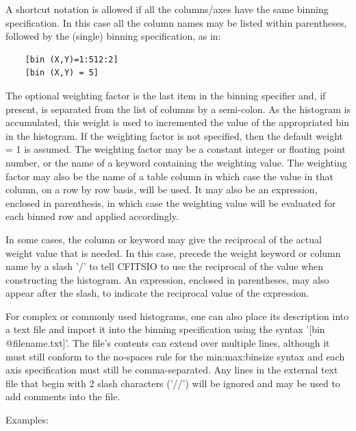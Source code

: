 \documentclass[11pt]{book}
\begin{document}
A shortcut notation is allowed if all the columns/axes have the same
binning specification.  In this case all the column names may be listed
within parentheses, followed by the (single) binning specification, as
in:

\begin{verbatim}
    [bin (X,Y)=1:512:2]
    [bin (X,Y) = 5]
\end{verbatim}

The optional weighting factor is the last item in the binning specifier
and, if present, is separated from the list of columns by a
semi-colon.  As the histogram is accumulated, this weight is used to
incremented the value of the appropriated bin in the histogram.  If the
weighting factor is not specified, then the default weight = 1 is
assumed.  The weighting factor may be a constant integer or floating
point number, or the name of a keyword containing the weighting value.
The weighting factor may also be the name of a table column in which case
the value in that column, on a row by row basis, will be used.
It may also be an expression, enclosed in parenthesis, in which case
the weighting value will be evaluated for each binned row and applied
accordingly.

In some cases, the column or keyword may give the reciprocal of the
actual weight value that is needed.  In this case, precede the weight
keyword or column name by a slash '/' to tell CFITSIO to use the
reciprocal of the value when constructing the histogram.  An expression,
enclosed in parentheses, may also appear after the slash, to
indicate the reciprocal value of the expression.

For  complex or commonly  used  histograms, one  can also  place its
description  into  a  text  file and  import   it  into  the binning
specification  using the  syntax '[bin  @filename.txt]'.  The file's
contents  can extend over   multiple lines, although  it must still
conform to the  no-spaces rule  for the min:max:binsize syntax and each
axis specification must still be comma-separated.  Any lines in the
external text file that begin with 2 slash characters ('//') will be
ignored and may be used to add comments into the file.

 Examples:
\end{document}
